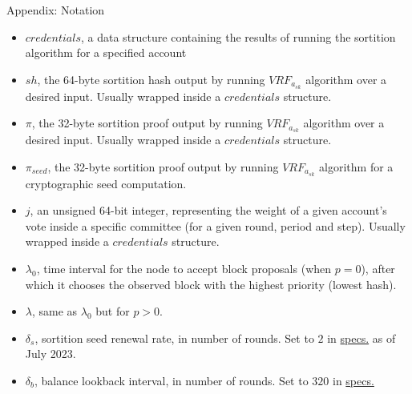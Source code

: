 \documentclass[10pt,a4paper]{article}
\begin{document}
\begin{section}{Appendix: Notation}


\begin{itemize}
    \item $credentials$, a data structure containing the results of running the sortition algorithm 
    for a specified account
    \item $sh$, the 64-byte sortition hash output by running $VRF_{a_{sk}}$ algorithm over a desired input.
    Usually wrapped inside a $credentials$ structure.
    \item $\pi$, the 32-byte sortition proof output by running $VRF_{a_{sk}}$ algorithm over a desired input.
    Usually wrapped inside a $credentials$ structure.
    \item $\pi_{seed}$, the 32-byte sortition proof output by running $VRF_{a_{sk}}$ algorithm for a cryptographic 
    seed computation.
    \item $j$, an unsigned 64-bit integer, representing the weight of a given account's vote inside a specific committee
    (for a given round, period and step).
    Usually wrapped inside a $credentials$ structure.
    \item $\lambda_0$, time interval for the node to accept block proposals (when $p=0$), after which it 
    chooses the observed block with the highest priority (lowest hash).
    \item $\lambda$, same as $\lambda_0$ but for $p > 0$.
    \item $\delta_s$, sortition seed renewal rate, in number of rounds. Set to $2$ in 
    \href{https://github.com/algorandfoundation/specs}{specs.} as of July 2023.
    \item $\delta_b$, balance lookback interval, in number of rounds. Set to $320$ in 
    \href{https://github.com/algorandfoundation/specs}{specs.}

\end{itemize}

\end{section}
\end{document}
